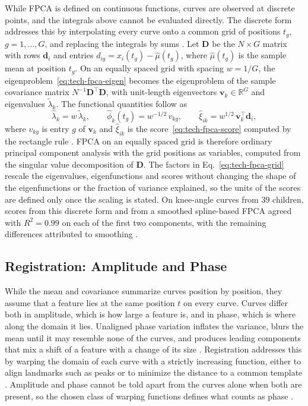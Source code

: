 While FPCA is defined on continuous functions, curves are observed at discrete points, and the integrals above cannot be evaluated directly.
The discrete form addresses this by interpolating every curve onto a common grid of positions $t_g$, $g = 1, \dots, G$, and replacing the integrals by sums \cite{ramsay2005fda}.
Let $\mathbf{D}$ be the $N \times G$ matrix with rows $\mathbf{d}_i$ and entries $d_{ig} = x_i(t_g) - \hat\mu(t_g)$, where $\hat\mu(t_g)$ is the sample mean at position $t_g$.
On an equally spaced grid with spacing $w = 1/G$, the eigenproblem~\eqref{eq:tech-fpca-eigen} becomes the eigenproblem of the sample covariance matrix $N^{-1}\mathbf{D}^\top\mathbf{D}$, with unit-length eigenvectors $\mathbf{v}_k \in \mathbb{R}^G$ and eigenvalues $\tilde\lambda_k$.
The functional quantities follow as
\begin{equation}
  \hat\lambda_k = w\, \tilde\lambda_k,
  \qquad
  \hat\phi_k(t_g) = w^{-1/2}\, v_{kg},
  \qquad
  \hat\xi_{ik} = w^{1/2}\, \mathbf{v}_k^\top \mathbf{d}_i ,
  \label{eq:tech-fpca-grid}
\end{equation}
where $v_{kg}$ is entry $g$ of $\mathbf{v}_k$ and $\hat\xi_{ik}$ is the score~\eqref{eq:tech-fpca-score} computed by the rectangle rule \cite{ramsay2005fda}.
FPCA on an equally spaced grid is therefore ordinary principal component analysis with the grid positions as variables, computed from the singular value decomposition of $\mathbf{D}$.
The factors in Eq.~\eqref{eq:tech-fpca-grid} rescale the eigenvalues, eigenfunctions and scores without changing the shape of the eigenfunctions or the fraction of variance explained, so the units of the scores are defined only once the scaling is stated.
On knee-angle curves from 39 children, scores from this discrete form and from a smoothed spline-based FPCA agreed with $R^2 = 0.99$ on each of the first two components, with the remaining differences attributed to smoothing \cite{warmenhoven2021pca}.

\subsection{Registration: Amplitude and Phase}
\label{sec:tech-fpca-registration}

While the mean and covariance summarize curves position by position, they assume that a feature lies at the same position $t$ on every curve.
Curves differ both in amplitude, which is how large a feature is, and in phase, which is where along the domain it lies.
Unaligned phase variation inflates the variance, blurs the mean until it may resemble none of the curves, and produces leading components that mix a shift of a feature with a change of its size \cite{wang2016fda, marron2015amplitude}.
Registration addresses this by warping the domain of each curve with a strictly increasing function, either to align landmarks such as peaks or to minimize the distance to a common template \cite{ramsay2005fda, wang2016fda}.
Amplitude and phase cannot be told apart from the curves alone when both are present, so the chosen class of warping functions defines what counts as phase \cite{wang2016fda, sangalli2009aneurisk}.

